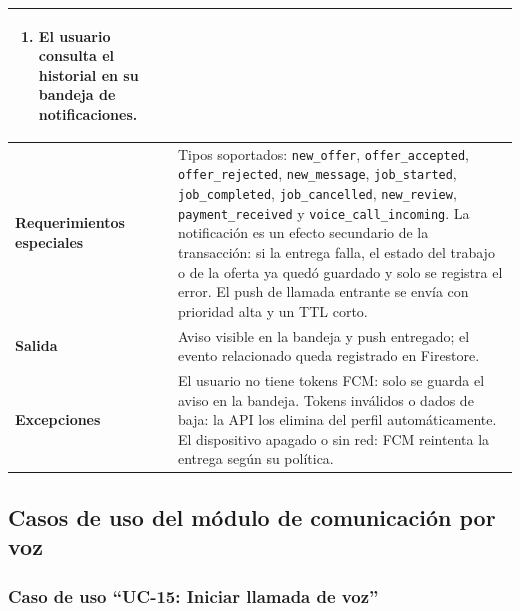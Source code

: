 \documentclass[doc,12pt,a4paper]{apa7}
\begin{document}
\begin{longtable}{|P{3.3cm}|L{11.2cm}|}
\begin{enumerate}
    \item El usuario consulta el historial en su bandeja de notificaciones.
\end{enumerate} \\ \hline
\textbf{Requerimientos especiales} & Tipos soportados: \texttt{new\_offer}, \texttt{offer\_accepted}, \texttt{offer\_rejected}, \texttt{new\_message}, \texttt{job\_started}, \texttt{job\_completed}, \texttt{job\_cancelled}, \texttt{new\_review}, \texttt{payment\_received} y \texttt{voice\_call\_incoming}. La notificación es un efecto secundario de la transacción: si la entrega falla, el estado del trabajo o de la oferta ya quedó guardado y solo se registra el error. El push de llamada entrante se envía con prioridad alta y un TTL corto. \\ \hline
\textbf{Salida} & Aviso visible en la bandeja y push entregado; el evento relacionado queda registrado en Firestore. \\ \hline
\textbf{Excepciones} & El usuario no tiene tokens FCM: solo se guarda el aviso en la bandeja. Tokens inválidos o dados de baja: la API los elimina del perfil automáticamente. El dispositivo apagado o sin red: FCM reintenta la entrega según su política. \\ \hline
\end{longtable}


\subsection{Casos de uso del módulo de comunicación por voz}

\subsubsection{Caso de uso ``UC-15: Iniciar llamada de voz''}
\end{document}

